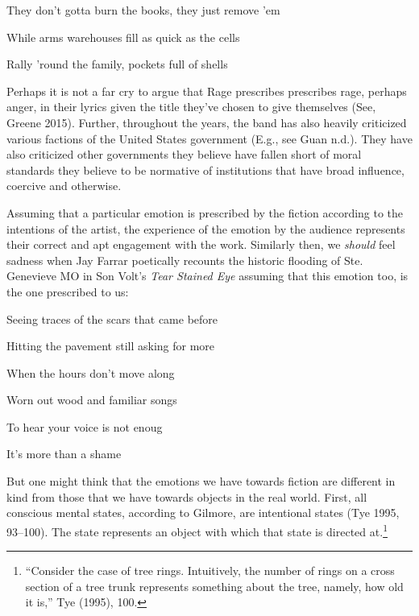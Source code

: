 \documentclass[12pt]{book}
\theoremstyle{definition}
\theoremstyle{remark}
\begin{document}
They don't gotta burn the books, they just remove 'em

While arms warehouses fill as quick as the cells

Rally 'round the family, pockets full of shells

\noindent Perhaps it is not a far cry to argue that Rage prescribes prescribes rage, perhaps anger, in their lyrics given the title they've chosen to give themselves (See, Greene 2015). Further, throughout the years, the band has also heavily criticized various factions of the United States government (E.g., see Guan n.d.). They have also criticized other governments they believe have fallen short of moral standards they believe to be normative of institutions that have broad influence, coercive and otherwise.

Assuming that a particular emotion is prescribed by the fiction according to the intentions of the artist, the experience of the emotion by the audience represents their correct and apt engagement with the work. Similarly then, we \emph{should} feel sadness when Jay Farrar poetically recounts the historic flooding of Ste. Genevieve MO in Son Volt's \emph{Tear Stained Eye} assuming that this emotion too, is the one prescribed to us:

Seeing traces of the scars that came before

Hitting the pavement still asking for more

When the hours don't move along

Worn out wood and familiar songs

To hear your voice is not enoug

It's more than a shame

But one might think that the emotions we have towards fiction are different in kind from those that we have towards objects in the real world. First, all conscious mental states, according to Gilmore, are intentional states (Tye 1995, 93--100). The state represents an object with which that state is directed at.\footnote{``Consider the case of tree rings. Intuitively, the number of rings on a cross section of a tree trunk represents something about the tree, namely, how old it is,'' Tye (1995), 100.}
\end{document}
